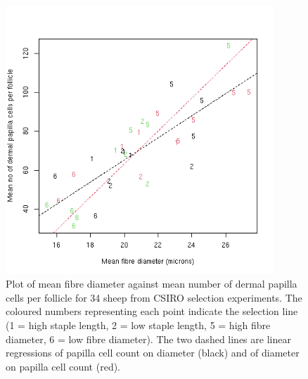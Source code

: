 %

\begin{figure}[!h]
  \centering
   \includegraphics[width=0.9\textwidth]{dpccdiam2.png}
  \caption{Plot of mean fibre diameter against mean number of dermal papilla cells per follicle for 34 sheep from CSIRO selection experiments. The coloured numbers representing each point indicate the selection line (1 = high staple length, 2 = low staple length, 5 = high fibre diameter, 6 = low fibre diameter). The two dashed lines are   linear regressions of papilla cell count on diameter (black) and of diameter on papilla cell count (red).}
  \label{fig:dpccdiam}
\end{figure}

%

